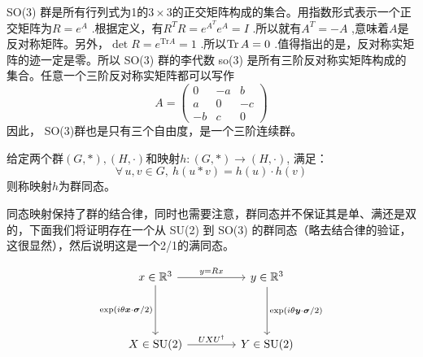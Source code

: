 SO(3) 群是所有行列式为1的$3\times3$的正交矩阵构成的集合。用指数形式表示一个正交矩阵为$R=e^A$ .根据定义，有$R^TR=e^{A^T}e^A=I$ .所以就有$A^T=-A$ ,意味着$A$是反对称矩阵。另外，$\det R=e^{\mathrm{Tr}A}=1$ .所以$\Tr A=0$ .值得指出的是，反对称实矩阵的迹一定是零。所以 SO(3) 群的李代数 so(3) 是所有三阶反对称实矩阵构成的集合。任意一个三阶反对称实矩阵都可以写作
\[A=\begin{pmatrix}0&-a&b\\a&0&-c\\-b&c&0\end{pmatrix}\]
因此， SO(3)群也是只有三个自由度，是一个三阶连续群。

\begin{definition}[群同态]
给定两个群$(G,\ast),(H,\cdot)$和映射$h:(G,*)\to(H,\cdot)$, 满足：
\[\forall \, u,v \in G, \ h(u*v)=h(u)\cdot h(v)\]
则称映射$h$为群同态。
\end{definition}

同态映射保持了群的结合律，同时也需要注意，群同态并不保证其是单、满还是双的，下面我们将证明存在一个从 SU(2) 到 SO(3) 的群同态（略去结合律的验证，这很显然），然后说明这是一个2/1的满同态。

\[
\begin{tikzcd}[row sep=1.5cm, column sep=1.5cm]
x\in\mathbb{R}^3 \arrow[r, "y=Rx"] \arrow[d, "\exp(i\theta\bm{x}\cdot\bm{\sigma}/2)"'] 
    & y\in\mathbb{R}^3 \arrow[d, "\exp(i\theta\bm{y}\cdot\bm{\sigma}/2)"] \\
X\in\text{SU(2)} \arrow[r, "UXU^\dagger"] 
    & Y\in\text{SU(2)}
\end{tikzcd}
\]

